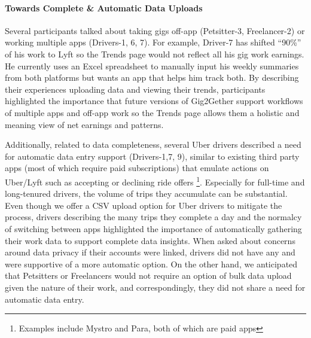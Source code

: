 \paragraph{\textbf{{Towards} Complete \& Automatic Data Uploads}} 
Several participants talked about taking gigs off-app (Petsitter-3, Freelancer-2) or {working} multiple apps (Drivers-1, 6, 7). For example, Driver-7 has shifted ``90\%'' of his work to Lyft so the Trends page would not reflect all his gig work earnings. He currently uses an Excel spreadsheet to manually input his weekly summaries from both platforms but wants an app that helps him track both.
{By describing their experiences uploading data and viewing their trends, participants highlighted the importance that} future versions of Gig2Gether {support workflows of multiple apps and off-app work so the} Trends page {allows them} a holistic {and meaning} view of net earnings and patterns. 

{Additionally,} related to data completeness, several Uber drivers described a need for automatic data entry support (Drivers-1,7, 9), similar to existing third party apps (most of which require paid subscriptions) that emulate actions on Uber/Lyft such as accepting or declining ride offers \footnote{Examples include Mystro and Para, both of which are paid apps}. Especially for full-time and long-tenured drivers, the volume of trips they accumulate can be substantial. Even though we offer a CSV upload option {for Uber drivers} to mitigate the process, drivers {describing the many trips they complete a day and the normalcy of switching between apps highlighted the importance of automatically gathering their work data to support complete data insights}. {When asked about concerns around data privacy if their accounts were linked, drivers did not have any and were supportive of a more automatic option.} {On the other hand, we anticipated that Petsitters or Freelancers would not require an option of bulk data upload given the nature of their work, and correspondingly, they did not share a need for automatic data entry.}



